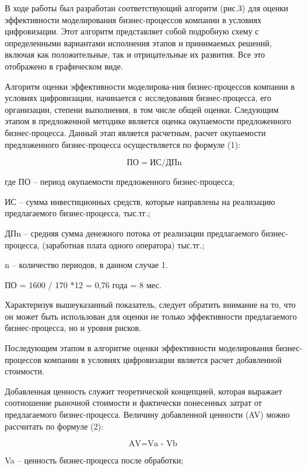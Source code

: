 \begin{multicols}{2}
В ходе работы был разработан соответствующий алгоритм (рис.3) для оценки
эффективности моделирования бизнес-процессов компании в условиях
цифровизации. Этот алгоритм представляет собой подробную схему с
определенными вариантами исполнения этапов и принимаемых решений,
включая как положительные, так и отрицательные их развития. Все это
отображено в графическом виде.

Алгоритм оценки эффективности моделирова-ния бизнес-процессов компании в
условиях цифровизации, начинается с исследования бизнес-процесса, его
организации, степени выполнения, в том числе общей оценки. Следующим
этапом в предложенной методике является оценка окупаемости предложенного
бизнес-процесса. Данный этап является расчетным, расчет окупаемости
предложенного бизнес-процесса осуществляется по формуле (1):


\begin{equation}
  \text{ПО} = \text{ИС} / \text{ДПn}
\end{equation}

где ПО -- период окупаемости предложенного бизнес-процесса;

ИС -- сумма инвестиционных средств, которые направлены на реализацию
предлагаемого бизнес-процесса, тыс.тг.;

ДПn -- средняя сумма денежного потока от реализации предлагаемого
бизнес-процесса, (заработная плата одного оператора) тыс.тг.;

n -- количество периодов, в данном случае 1.

ПО = 1600 / 170 *12 = 0,76 года = 8 мес.

Характеризуя вышеуказанный показатель, следует обратить внимание на то,
что он может быть использован для оценки не только эффективности
предлагаемого бизнес-процесса, но и уровня рисков.

Последующим этапом в алгоритме оценки эффективности моделирования
бизнес-процессов компании в условиях цифровизации является расчет
добавленной стоимости.

Добавленная ценность служит теоретической концепцией, которая выражает
соотношение рыночной стоимости и фактически понесенных затрат от
предлагаемого бизнес-процесса. Величину добавленной ценности (AV) можно
рассчитать по формуле (2):

\begin{equation}
  \text{AV} = \text{Va - Vb }
\end{equation}
 

Va -- ценность бизнес-процесса после обработки;


\end{multicols}
